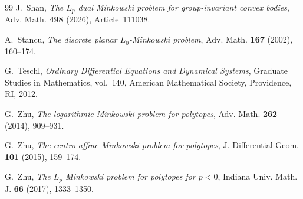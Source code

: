 \documentclass[12pt,reqno]{amsart}
\numberwithin{equation}{section}
\theoremstyle{remark}
\begin{document}
\begin{thebibliography}{99}
	J.~Shan,
	\emph{The $L_p$ dual Minkowski problem for group-invariant convex bodies},
	Adv. Math. \textbf{498} (2026), Article~111038.
	
	A.~Stancu,
	\emph{The discrete planar $L_0$-Minkowski problem},
	Adv. Math. \textbf{167} (2002), 160--174.
	
	G.~Teschl,
	\emph{Ordinary Differential Equations and Dynamical Systems},
	Graduate Studies in Mathematics, vol.~140,
	American Mathematical Society, Providence, RI, 2012.
	
	G.~Zhu,
	\emph{The logarithmic Minkowski problem for polytopes},
	Adv. Math. \textbf{262} (2014), 909--931.
	
	G.~Zhu,
	\emph{The centro-affine Minkowski problem for polytopes},
	J. Differential Geom. \textbf{101} (2015), 159--174.
	
	G.~Zhu,
	\emph{The $L_p$ Minkowski problem for polytopes for $p<0$},
	Indiana Univ. Math. J. \textbf{66} (2017), 1333--1350.
	
\end{thebibliography}
\end{document}
